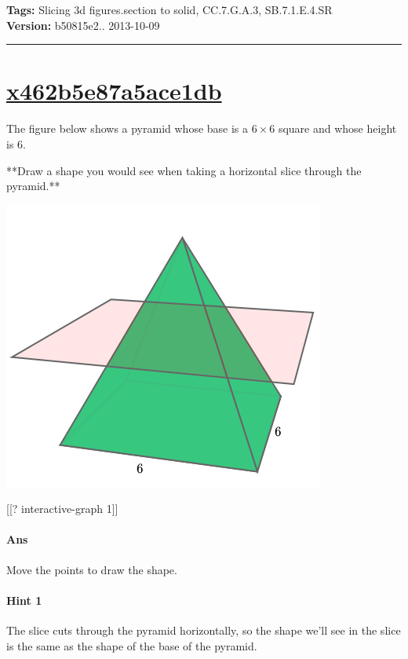 \documentclass[twocolumn,10pt]{article}
\def\shrinkfactor{0.4}
\begin{document}
\medskip
\noindent
\textbf{Tags:} {\footnotesize Slicing 3d figures.section to solid, CC.7.G.A.3, SB.7.1.E.4.SR}\\
\textbf{Version:} b50815e2.. 2013-10-09
\smallskip\hrule





\section{\href{https://www.khanacademy.org/devadmin/content/items/x462b5e87a5ace1db}{x462b5e87a5ace1db}}

\noindent
The figure below shows a pyramid whose base is a $6\times 6$ square and whose height is $6$.   

**Draw a shape you would see when taking a horizontal slice through the pyramid.**


\includegraphics[scale=\shrinkfactor]{figures/4e6db0b061f7d0aaab47e90516b4d1a2b8bb2023.png}

[[? interactive-graph 1]] 

\paragraph{Ans} Move the points to draw the shape. 

\paragraph{Hint 1}The slice cuts through the pyramid horizontally, so the shape we'll see in the slice is the same as the shape of the base of the pyramid.
\end{document}
